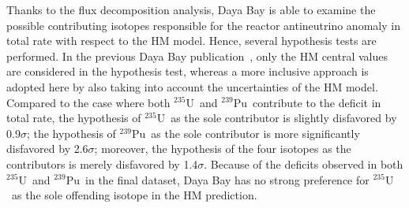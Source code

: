 \documentclass[aps,prl,showpacs,showkeys,amsmath,amssymb,twocolumn,floatfix,superscriptaddress,nofootinbib]{revtex4-1}
\newcommand{\Ufive}{$\mathrm{^{235}U}$}
\newcommand{\Punine}{$\mathrm{^{239}Pu}$}
\begin{document}
Thanks to the flux decomposition analysis, Daya Bay is able to examine the possible contributing isotopes responsible for the reactor antineutrino anomaly in total rate with respect to the HM model. Hence, several hypothesis tests are performed.
In the previous Daya Bay publication~\cite{DayaBay_PRL_evolution2017}, only the HM central values are considered in the hypothesis test, whereas a more inclusive approach is adopted here by also taking into account the uncertainties of the HM model.
Compared to the case where both \Ufive\ and \Punine\ contribute to the deficit in total rate,
the hypothesis of \Ufive\ as the sole contributor is slightly disfavored by 0.9$\sigma$;
the hypothesis of \Punine\ as the sole contributor is more significantly disfavored by 2.6$\sigma$;
moreover, the hypothesis of the four isotopes as the contributors is merely disfavored by 1.4$\sigma$.
Because of the deficits observed in both \Ufive\ and \Punine\ in the final dataset, Daya Bay has no strong preference for \Ufive\ as the sole offending isotope in the HM prediction.


























\end{document}
